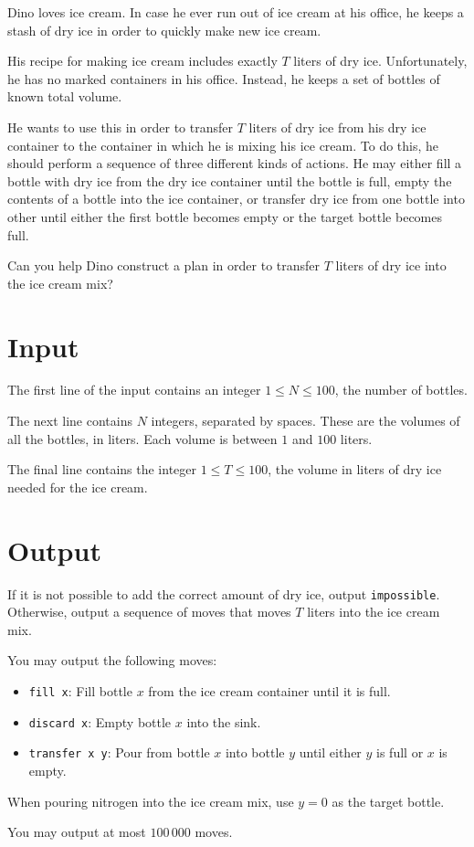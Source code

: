 Dino loves ice cream. 
In case he ever run out of ice cream at his office, he keeps a stash of dry ice in order to quickly make new ice cream.

His recipe for making ice cream includes exactly $T$ liters of dry ice.
Unfortunately, he has no marked containers in his office.
Instead, he keeps a set of bottles of known total volume.

He wants to use this in order to transfer $T$ liters of dry ice from his dry ice container to the container in which he is mixing his ice cream.
To do this, he should perform a sequence of three different kinds of actions.
He may either fill a bottle with dry ice from the dry ice container until the bottle is full, empty the contents of a bottle into the ice container, or transfer dry ice from one bottle into other until either the first bottle becomes empty or the target bottle becomes full.

Can you help Dino construct a plan in order to transfer $T$ liters of dry ice into the ice cream mix?

\section*{Input}
The first line of the input contains an integer $1 \le N \le 100$, the number of bottles.

The next line contains $N$ integers, separated by spaces.
These are the volumes of all the bottles, in liters.
Each volume is between $1$ and $100$ liters.

The final line contains the integer $1 \le T \le 100$, the volume in liters of dry ice needed for the ice cream.

\section*{Output}
If it is not possible to add the correct amount of dry ice, output \texttt{impossible}.
Otherwise, output a sequence of moves that moves $T$ liters into the ice cream mix.

You may output the following moves:
\begin{itemize}
\item \texttt{fill x}: Fill bottle $x$ from the ice cream container until it is full.
\item \texttt{discard x}: Empty bottle $x$ into the sink.
\item \texttt{transfer x y}: Pour from bottle $x$ into bottle $y$ until either $y$ is full or $x$ is empty.
\end{itemize}

When pouring nitrogen into the ice cream mix, use $y = 0$ as the target bottle.

You may output at most $100\,000$ moves.
